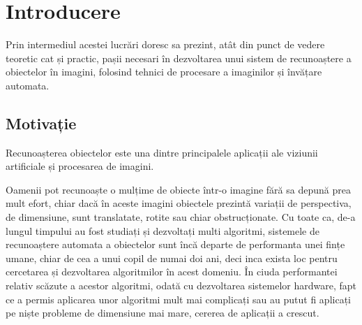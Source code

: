\chapter{Introducere}


Prin intermediul acestei lucrări doresc sa prezint, atât din punct de vedere teoretic cat și practic, pașii necesari în dezvoltarea unui sistem de recunoaștere a obiectelor în imagini, folosind tehnici de procesare a imaginilor și învățare automata.



\section{Motivație}

Recunoașterea obiectelor este una dintre principalele aplicații ale viziunii artificiale și procesarea de imagini. 

Oamenii pot recunoaște o mulțime de obiecte într-o imagine fără sa depună prea mult efort, chiar dacă în aceste imagini obiectele prezintă variații de perspectiva, de dimensiune, sunt translatate, rotite sau chiar obstrucționate. 
Cu toate ca, de-a lungul timpului au fost studiați și dezvoltați multi algoritmi, sistemele de recunoaștere automata a obiectelor sunt încă departe de performanta unei fințe umane, chiar de cea a unui copil de numai doi ani, deci inca exista loc pentru cercetarea și dezvoltarea algoritmilor în acest domeniu.
În ciuda performantei relativ scăzute a acestor algoritmi, odată cu dezvoltarea sistemelor hardware, fapt ce a permis aplicarea unor algoritmi mult mai complicați sau au putut fi aplicați pe niște probleme de dimensiune mai mare, cererea de aplicații a crescut. 

